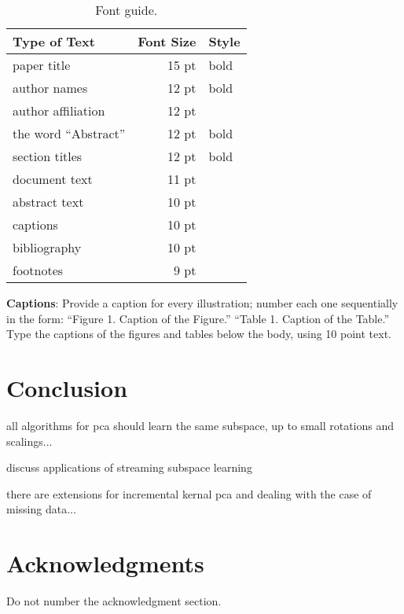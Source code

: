 \documentclass[11pt,letterpaper]{article}
\begin{document}
\begin{table}
\begin{center}
\begin{tabular}{|l|rl|}
\hline \bf Type of Text & \bf Font Size & \bf Style \\ \hline
paper title & 15 pt & bold \\
author names & 12 pt & bold \\
author affiliation & 12 pt & \\
the word ``Abstract'' & 12 pt & bold \\
section titles & 12 pt & bold \\
document text & 11 pt  &\\
abstract text & 10 pt & \\
captions & 10 pt & \\
bibliography & 10 pt & \\
footnotes & 9 pt & \\
\hline
\end{tabular}
\end{center}
\caption{\label{font-table} Font guide. }
\end{table}

{\bf Captions}: Provide a caption for every illustration; number each one
sequentially in the form:  ``Figure 1. Caption of the Figure.'' ``Table 1.
Caption of the Table.''  Type the captions of the figures and 
tables below the body, using 10 point text.  

\section{Conclusion}

all algorithms for pca should learn the same subspace, up to small rotations and scalings...

discuss applications of streaming subspace learning

there are extensions for incremental kernal pca and dealing with the case of missing data...

\section*{Acknowledgments}

Do not number the acknowledgment section.
\end{document}

